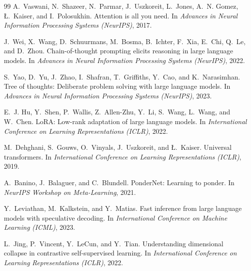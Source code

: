 \documentclass[11pt,a4paper]{article}
\theoremstyle{plain}
\theoremstyle{definition}
\theoremstyle{remark}
\begin{document}

\begin{thebibliography}{99}
A.~Vaswani, N.~Shazeer, N.~Parmar, J.~Uszkoreit, L.~Jones, A.~N. Gomez, {\L}.~Kaiser, and I.~Polosukhin.
\newblock Attention is all you need.
\newblock In \emph{Advances in Neural Information Processing Systems (NeurIPS)}, 2017.

J.~Wei, X.~Wang, D.~Schuurmans, M.~Bosma, B.~Ichter, F.~Xia, E.~Chi, Q.~Le, and D.~Zhou.
\newblock Chain-of-thought prompting elicits reasoning in large language models.
\newblock In \emph{Advances in Neural Information Processing Systems (NeurIPS)}, 2022.

S.~Yao, D.~Yu, J.~Zhao, I.~Shafran, T.~Griffiths, Y.~Cao, and K.~Narasimhan.
\newblock Tree of thoughts: Deliberate problem solving with large language models.
\newblock In \emph{Advances in Neural Information Processing Systems (NeurIPS)}, 2023.

E.~J. Hu, Y.~Shen, P.~Wallis, Z.~Allen-Zhu, Y.~Li, S.~Wang, L.~Wang, and W.~Chen.
\newblock LoRA: Low-rank adaptation of large language models.
\newblock In \emph{International Conference on Learning Representations (ICLR)}, 2022.

M.~Dehghani, S.~Gouws, O.~Vinyals, J.~Uszkoreit, and {\L}.~Kaiser.
\newblock Universal transformers.
\newblock In \emph{International Conference on Learning Representations (ICLR)}, 2019.

A.~Banino, J.~Balaguer, and C.~Blundell.
\newblock PonderNet: Learning to ponder.
\newblock In \emph{NeurIPS Workshop on Meta-Learning}, 2021.

Y.~Leviathan, M.~Kalkstein, and Y.~Matias.
\newblock Fast inference from large language models with speculative decoding.
\newblock In \emph{International Conference on Machine Learning (ICML)}, 2023.

L.~Jing, P.~Vincent, Y.~LeCun, and Y.~Tian.
\newblock Understanding dimensional collapse in contrastive self-supervised learning.
\newblock In \emph{International Conference on Learning Representations (ICLR)}, 2022.
\end{thebibliography}
\end{document}
